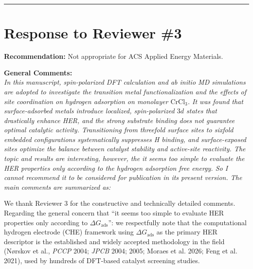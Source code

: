 \documentclass[11pt, sans, a4paper]{moderncv}
\begin{document}
\vspace{1.5em}
\noindent\rule{\textwidth}{0.6pt}

\newpage

\section{Response to Reviewer \#3}

\noindent\textbf{Recommendation:} Not appropriate for ACS Applied Energy Materials.

\vspace{0.5em}
\noindent\textbf{General Comments:}\\
\textit{In this manuscript, spin-polarized DFT calculation and ab initio MD simulations are adopted to investigate the transition metal functionalization and the effects of site coordination on hydrogen adsorption on monolayer $\text{CrCl}_3$. It was found that surface-adsorbed metals introduce localized, spin-polarized $3d$ states that drastically enhance HER, and the strong substrate binding does not guarantee optimal catalytic activity. Transitioning from threefold surface sites to sixfold embedded configurations systematically suppresses H binding, and surface-exposed sites optimize the balance between catalyst stability and active-site reactivity. The topic and results are interesting, however, the it seems too simple to evaluate the HER properties only according to the hydrogen adsorption free energy. So I cannot recommend it to be considered for publication in its present version. The main comments are summarized as:}

\vspace{0.5em}
\noindent We thank Reviewer 3 for the constructive and technically detailed comments. Regarding the general concern that ``it seems too simple to evaluate HER properties only according to $\Delta G_{\mathrm{ads}}$'': we respectfully note that the computational hydrogen electrode (CHE) framework using $\Delta G_{\mathrm{ads}}$ as the primary HER descriptor is the established and widely accepted methodology in the field (N{\o}rskov et al., \textit{PCCP} 2004; \textit{JPCB} 2004; 2005; Moraes et al. 2026; Feng et al. 2021), used by hundreds of DFT-based catalyst screening studies.

\vspace{1em}
\end{document}

